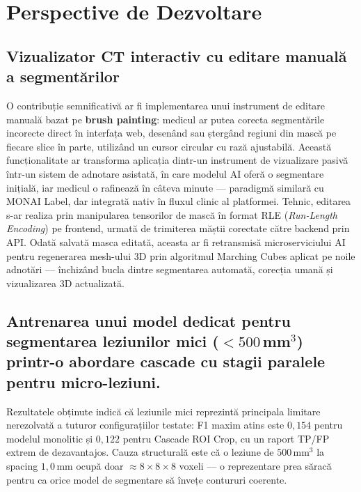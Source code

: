 \documentclass[12pt, a4paper]{report}
\begin{document}
\section{Perspective de Dezvoltare}

\subsection{Vizualizator CT interactiv cu editare manuală a segmentărilor}



O contribuție semnificativă ar fi implementarea unui
instrument de editare manuală bazat pe \textbf{brush painting}: medicul ar putea
corecta segmentările incorecte direct în interfața web, desenând sau ștergând
regiuni din mască pe fiecare slice în parte, utilizând un cursor circular cu
rază ajustabilă. Această funcționalitate ar transforma aplicația dintr-un
instrument de vizualizare pasivă într-un sistem de adnotare asistată, în
care modelul AI oferă o segmentare inițială, iar medicul o rafinează în câteva
minute --- paradigmă similară cu MONAI Label, dar integrată nativ în fluxul
clinic al platformei. Tehnic, editarea s-ar realiza prin manipularea tensorilor
de mască în format RLE (\textit{Run-Length Encoding}) pe frontend, urmată de
trimiterea măștii corectate către backend prin API. Odată salvată masca editată,
aceasta ar fi retransmisă microserviciului AI pentru regenerarea mesh-ului 3D
prin algoritmul Marching Cubes aplicat pe noile adnotări --- închizând bucla
dintre segmentarea automată, corecția umană și vizualizarea 3D actualizată.


\subsection{Antrenarea unui model dedicat pentru segmentarea leziunilor mici
      ($< 500$\,mm$^3$) printr-o abordare cascade cu stagii paralele pentru
      micro-leziuni.}
      Rezultatele obținute indică că leziunile mici reprezintă principala
      limitare nerezolvată a tuturor configurațiilor testate: F1 maxim atins
      este $0{,}154$ pentru modelul monolitic și $0{,}122$ pentru Cascade ROI
      Crop, cu un raport TP/FP extrem de dezavantajos. Cauza structurală este
      că o leziune de $500$\,mm$^3$ la spacing $1{,}0$\,mm ocupă doar
      $\approx 8 \times 8 \times 8$ voxeli — o reprezentare prea săracă pentru
      ca orice model de segmentare să învețe contururi coerente.
\end{document}
